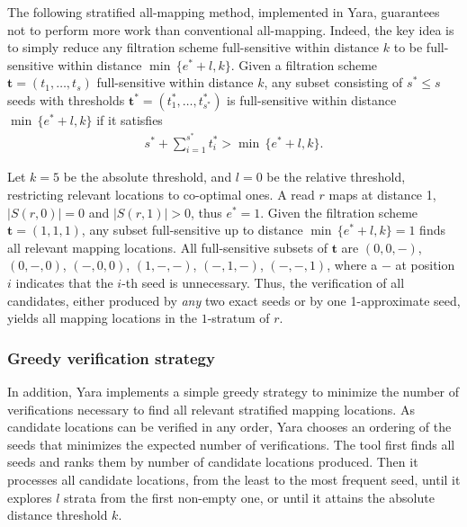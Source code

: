 The following stratified all-mapping method, implemented in Yara, guarantees not to perform more work than conventional all-mapping.
Indeed, the key idea is to simply reduce any filtration scheme full-sensitive within distance $k$ to be full-sensitive within distance $\min \,\{ e^*+l, k\}$.
Given a filtration scheme $\mathbf{t}=(t_1,\dots,t_s)$ full-sensitive within distance $k$, any subset consisting of $s^* \leq s$ seeds with thresholds $\mathbf{t^*}=(t^{*}_{1},\dots,t^{*}_{s^*})$ is full-sensitive within distance $\min \,\{ e^*+l, k\}$ if it satisfies
\begin{eqnarray}
s^* + \sum_{i=1}^{s^*} t_i^* > \min \,\{ e^*+l, k\}.
\end{eqnarray}

\begin{example}
Let $k=5$ be the absolute threshold, and $l=0$ be the relative threshold, restricting relevant locations to co-optimal ones.
A read $r$ maps at distance 1, \ie $|S(r,0)| = 0$ and $|S(r,1)| > 0$, thus $e^* = 1$.
Given the filtration scheme $\mathbf{t}=(1,1,1)$, any subset full-sensitive up to distance $\min \,\{ e^*+l, k\} = 1$ finds all relevant mapping locations.
All full-sensitive subsets of $\mathbf{t}$ are $(0,0,-)$, $(0,-,0)$, $(-,0,0)$, $(1,-,-)$, $(-,1,-)$, $(-,-,1)$, where a $-$ at position $i$ indicates that the $i$-th seed is unnecessary.
Thus, the verification of all candidates, either produced by \emph{any} two exact seeds or by one 1-approximate seed, yields all mapping locations in the $1$-stratum of $r$.
\end{example}

\subsubsection{Greedy verification strategy}

In addition, Yara implements a simple greedy strategy to minimize the number of verifications necessary to find all relevant stratified mapping locations.
As candidate locations can be verified in any order, Yara chooses an ordering of the seeds that minimizes the expected number of verifications.
The tool first finds all seeds and ranks them by number of candidate locations produced.
Then it processes all candidate locations, from the least to the most frequent seed, until it explores $l$ strata from the first non-empty one, or until it attains the absolute distance threshold $k$.

